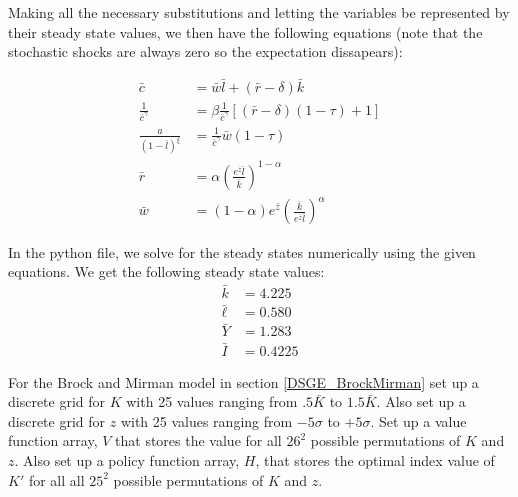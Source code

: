 \documentclass[letterpaper,11pt]{article}
\theoremstyle{definition}
\begin{document}
\begin{spacing}{1.5}
	Making all the necessary substitutions and letting the variables be represented by their steady state values, we then have the following equations (note that the stochastic shocks are always zero so the expectation dissapears):

	\begin{align*}
		\bar{c} &= \bar{w}\bar{l}+(\bar{r}-\delta)\bar{k} \\
		\frac{1}{\bar{c}^\gamma} &=  \beta \frac{1}{\bar{c}^\gamma}[(\bar{r}-\delta)(1-\tau)+1] \\
		\frac{a}{(1-\bar{l})^\xi} &= \frac{1}{\bar{c}^\gamma} \bar{w}(1-\tau)\\
		\bar{r}&= \alpha (\frac{e^{\bar{z}}\bar{l}}{\bar{k}})^{1-\alpha}\\
		\bar{w}&= (1-\alpha)e^{\bar{z}} (\frac{\bar{k}}{e^{\bar{z}}\bar{l}})^{\alpha}
	\end{align*}

	In the python file, we solve for the steady states numerically using the given equations. We get the following steady state values:
	\begin{align*}
		\bar{k} &=  4.225\\
		\bar{\ell} &= 0.580 \\
		\bar{Y} &= 1.283\\
		\bar{I} &= 0.4225
	\end{align*}


	\setcounter{Exercise}{7}
	\begin{Exercise} \label{DSGE_HW_BM_Grid}
		For the Brock and Mirman model in section \eqref{DSGE_BrockMirman} set up a discrete grid for $K$ with 25 values ranging from $.5 \bar K$ to $1.5 \bar K$.  Also set up a discrete grid for $z$ with 25 values ranging from $-5\sigma$ to $+5\sigma$.  Set up a value function array, $V$ that stores the value for all $26^2$ possible permutations of $K$ and $z$.  Also set up a policy function array, $H$, that stores the optimal index value of $K'$ for all all $25^2$ possible permutations of $K$ and $z$.


\end{Exercise}
\end{spacing}
\end{document}
